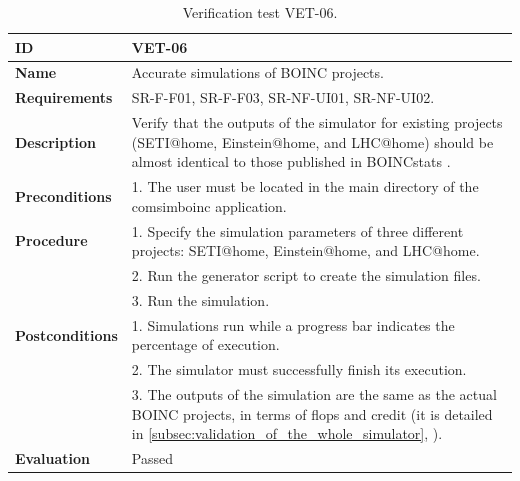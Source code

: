 \begin{center}
\begin{table}[htb]
\centering
\begin{tabular}{@{}p{2.5cm} p{13cm}@{}} 
\toprule
\textbf{ID} 					& VET-06 \\
\midrule
\textbf{Name} 				& Accurate simulations of BOINC projects. \\
\midrule
\textbf{Requirements} 		& SR-F-F01, SR-F-F03, SR-NF-UI01, SR-NF-UI02. \\
\midrule
\textbf{Description} 		& Verify that the outputs of the simulator for existing projects (SETI@home, Einstein@home, and LHC@home) should be almost identical to those published in BOINCstats \cite{BOINC2016}. \\
\midrule
\textbf{Preconditions}		& 1. The user must be located in the main directory of the \gls{comsimboinc} application. \\
\midrule
\textbf{Procedure}			& 1. Specify the simulation parameters of three different projects: SETI@home, Einstein@home, and LHC@home. \\
							& 2. Run the generator script to create the simulation files.\\
							& 3. Run the simulation.\\
\midrule
\textbf{Postconditions} 		& 1. Simulations run while a progress bar indicates the percentage of execution. \\
							& 2. The simulator must successfully finish its execution. \\
							& 3. The outputs of the simulation are the same as the actual BOINC projects, in terms of \acrshort{flops} and credit (it is detailed in \ref{subsec:validation_of_the_whole_simulator}, \textit{\nameref{subsec:validation_of_the_whole_simulator}}). \\
\midrule
\textbf{Evaluation} 			& Passed \\
\bottomrule
\end{tabular}
\caption{Verification test VET-06.}
\label{tab:vet06}
\end{table}
\end{center}


